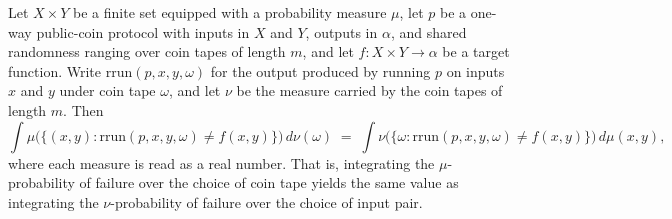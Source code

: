 \begin{lemma}
\label{CommunicationComplexity.PublicCoin.OneWay.failureIntegral_swap}
\leanok
{}
Let $X \times Y$ be a finite set equipped with a probability measure $\mu$, let $p$ be a
one-way public-coin protocol with inputs in $X$ and $Y$, outputs in $\alpha$, and shared
randomness ranging over coin tapes of length $m$, and let $f : X \times Y \to \alpha$ be
a target function. Write $\mathrm{rrun}(p, x, y, \omega)$ for the output produced by
running $p$ on inputs $x$ and $y$ under coin tape $\omega$, and let $\nu$ be the measure
carried by the coin tapes of length $m$. Then
\[
  \int \mu\bigl(\{(x,y) : \mathrm{rrun}(p,x,y,\omega) \neq f(x,y)\}\bigr)\,d\nu(\omega)
  \;=\;
  \int \nu\bigl(\{\omega : \mathrm{rrun}(p,x,y,\omega) \neq f(x,y)\}\bigr)\,d\mu(x,y),
\]
where each measure is read as a real number. That is, integrating the $\mu$-probability
of failure over the choice of coin tape yields the same value as integrating the
$\nu$-probability of failure over the choice of input pair.
\end{lemma}

